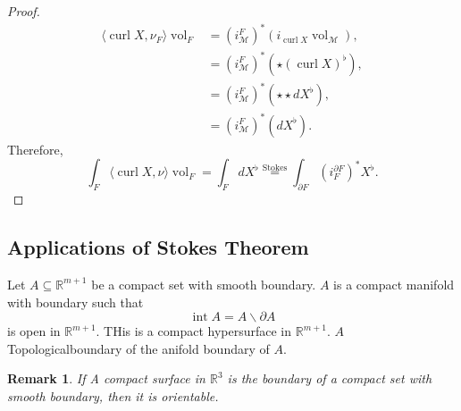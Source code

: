\documentclass[10pt]{article}
\newtheorem{remark}{Remark}[section]
\DeclareMathOperator{\interior}{int}
\DeclareMathOperator{\vol}{vol}
\DeclareMathOperator{\curl}{curl}
\newcommand{\R}[0]{\mathbb{R}}
\newcommand{\M}[0]{\mathcal{M}}
\begin{document}
\begin{proof}
  \begin{align*}
    \langle \curl X,\nu_F\rangle\vol_F & = (i_\M^F)^*(i_{\curl X}\vol_\M),\\
    & = (i_\M^F)^*(\star(\curl X)^\flat),\\
    & = (i_\M^F)^*(\star\star dX^\flat),\\
    & = (i_\M^F)^*(dX^\flat).
  \end{align*}
 Therefore,
 \begin{equation*}
  \int_F\langle\curl X,\nu\rangle \vol_F = \int_FdX^\flat \stackrel{\text{Stokes}}{=}\int_{\partial F}(i_F^{\partial F})^*X^\flat.
 \end{equation*}
\end{proof}


\subsection{Applications of Stokes Theorem}

Let $A\subseteq \R^{m+1}$ be a compact set with smooth boundary. $A$ is a compact manifold with boundary such that  
\begin{equation*}
  \interior A = A\backslash \partial A
\end{equation*}
is open in $\R^{m+1}$. THis is a compact hypersurface in $\R^{m+1}$. $A$ Topologicalboundary of the anifold boundary of $A$. 

\begin{remark}
  If A compact surface in $\R^3$ is the boundary of a compact set with smooth boundary, then it is orientable.
\end{remark}
\end{document}
